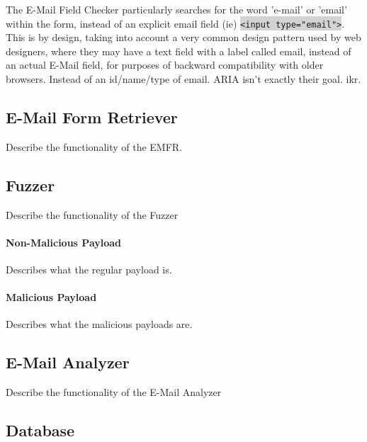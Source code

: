 	The E-Mail Field Checker particularly searches for the word 'e-mail' or 'email' within the form, instead of an explicit email field (ie) \colorbox{lightgray}{\lstinline{<input type="email">}}. This is by design, taking into account a very common design pattern used by web designers, where they may have a text field with a label called email, instead of an actual E-Mail field, for purposes of backward compatibility with older browsers.
	Instead of an id/name/type of email. ARIA isn't exactly their goal. ikr.
	

\subsection{E-Mail Form Retriever}
	\label{Comp:EMFR}
	Describe the functionality of the EMFR.
		
\subsection{Fuzzer}
	\label{Comp:Fuzzer}
	Describe the functionality of the Fuzzer
	\paragraph{Non-Malicious Payload}
		\label{Comp:Fuzzer:nmp}
		Describes what the regular payload is.
		
	\paragraph{Malicious Payload}
		\label{Comp:Fuzzer:mp}
		Describes what the malicious payloads are.
		
\subsection{E-Mail Analyzer}
	\label{Comp:EMA}
	Describe the functionality of the E-Mail Analyzer
	
\subsection{Database}
